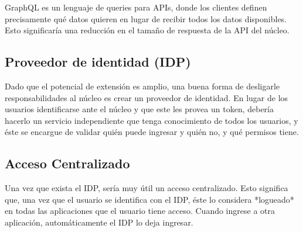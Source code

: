 GraphQL es un lenguaje de queries para APIs, donde los clientes definen precisamente qué datos quieren en lugar de recibir todos los datos disponibles. Esto significaría una reducción en el tamaño de respuesta de la API del núcleo.

\subsection[Proveedor de identidad (IDP)]{Proveedor de identidad (IDP)}

Dado que el potencial de extensión es amplio, una buena forma de desligarle responsabilidades al núcleo es crear un proveedor de identidad. En lugar de los usuarios identificarse ante el núcleo y que este les provea un token, debería hacerlo un servicio independiente que tenga conocimiento de todos los usuarios, y éste se encargue de validar quién puede ingresar y quién no, y qué permisos tiene.

\subsection[Acceso Centralizado]{Acceso Centralizado}

Una vez que exista el IDP, sería muy útil un acceso centralizado. Esto significa que, una vez que el usuario se identifica con el IDP, éste lo considera *logueado* en todas las aplicaciones que el usuario tiene acceso. Cuando ingrese a otra aplicación, automáticamente el IDP lo deja ingresar.



